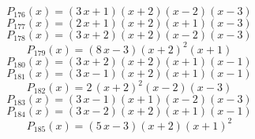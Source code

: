 \subitem \begin{dmath*}P_{176}(x) = {\left(3 \, x + 1\right)} {\left(x + 2\right)} {\left(x - 2\right)} {\left(x - 3\right)} \end{dmath*}\vspace{-1.2cm}
\subitem \begin{dmath*}P_{177}(x) = {\left(2 \, x + 1\right)} {\left(x + 2\right)} {\left(x + 1\right)} {\left(x - 3\right)} \end{dmath*}\vspace{-1.2cm}
\subitem \begin{dmath*}P_{178}(x) = {\left(3 \, x + 2\right)} {\left(x + 2\right)} {\left(x - 2\right)} {\left(x - 3\right)} \end{dmath*}\vspace{-1.2cm}
\subitem \begin{dmath*}P_{179}(x) = {\left(8 \, x - 3\right)} {\left(x + 2\right)}^{2} {\left(x + 1\right)} \end{dmath*}\vspace{-1.2cm}
\subitem \begin{dmath*}P_{180}(x) = {\left(3 \, x + 2\right)} {\left(x + 2\right)} {\left(x + 1\right)} {\left(x - 1\right)} \end{dmath*}\vspace{-1.2cm}
\subitem \begin{dmath*}P_{181}(x) = {\left(3 \, x - 1\right)} {\left(x + 2\right)} {\left(x + 1\right)} {\left(x - 1\right)} \end{dmath*}\vspace{-1.2cm}
\subitem \begin{dmath*}P_{182}(x) = 2 \, {\left(x + 2\right)}^{2} {\left(x - 2\right)} {\left(x - 3\right)} \end{dmath*}\vspace{-1.2cm}
\subitem \begin{dmath*}P_{183}(x) = {\left(3 \, x - 1\right)} {\left(x + 1\right)} {\left(x - 2\right)} {\left(x - 3\right)} \end{dmath*}\vspace{-1.2cm}
\subitem \begin{dmath*}P_{184}(x) = {\left(3 \, x - 2\right)} {\left(x + 2\right)} {\left(x + 1\right)} {\left(x - 1\right)} \end{dmath*}\vspace{-1.2cm}
\subitem \begin{dmath*}P_{185}(x) = {\left(5 \, x - 3\right)} {\left(x + 2\right)} {\left(x + 1\right)}^{2} \end{dmath*}\vspace{-1.2cm}
